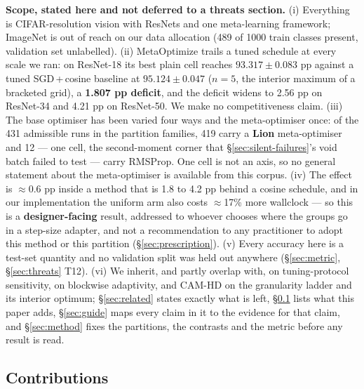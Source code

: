 \documentclass[10pt,letterpaper]{article}
\begin{document}
\textbf{Scope, stated here and not deferred to a threats section.} (i) Everything is
CIFAR-resolution vision with ResNets and one meta-learning framework; ImageNet is out of reach
on our data allocation (489 of 1000 train classes present, validation set unlabelled).
(ii) MetaOptimize trails a tuned schedule at every scale we ran: on ResNet-18 its best plain
cell reaches $93.317 \pm 0.083$ pp against a tuned SGD\,+\,cosine baseline at
$95.124 \pm 0.047$ ($n = 5$, the interior maximum of a bracketed grid), a \textbf{1.807 pp
deficit}, and the deficit widens to 2.56 pp on ResNet-34 and 4.21 pp on ResNet-50. We make no
competitiveness claim. (iii) The base optimiser has been varied four ways and the meta-optimiser
once: of the 431 admissible runs in the partition families, 419 carry a \textbf{Lion}
meta-optimiser and 12 --- one cell, the second-moment corner that
\S\ref{sec:silent-failures}'s void batch failed to test --- carry RMSProp. One cell is not an
axis, so no general statement about the meta-optimiser is available from this corpus.
(iv) The effect is $\approx 0.6$ pp inside a method that is 1.8 to 4.2 pp behind a cosine
schedule, and in our implementation the uniform arm also costs $\approx$17\% more wallclock ---
so this is a \textbf{designer-facing} result, addressed to whoever chooses where the groups go
in a step-size adapter, and not a recommendation to any practitioner to adopt this method or
this partition (\S\ref{sec:prescription}). (v) Every accuracy here is a test-set quantity and no
validation split was held out
anywhere (\S\ref{sec:metric}, \S\ref{sec:threats} T12). (vi) We inherit, and partly overlap
with, \citet{choi2020empirical} on tuning-protocol sensitivity, \citet{zheng2019blockwise} on
blockwise adaptivity, and CAM-HD \citep{jie2022camhd} on the granularity ladder and its
interior optimum; \S\ref{sec:related} states exactly what is left, \S\ref{sec:contributions} lists what this paper
adds, \S\ref{sec:guide} maps every claim in it to the evidence for that claim, and
\S\ref{sec:method} fixes the partitions, the contrasts and the metric before any result
is read.

\subsection{Contributions}
\label{sec:contributions}
\end{document}
